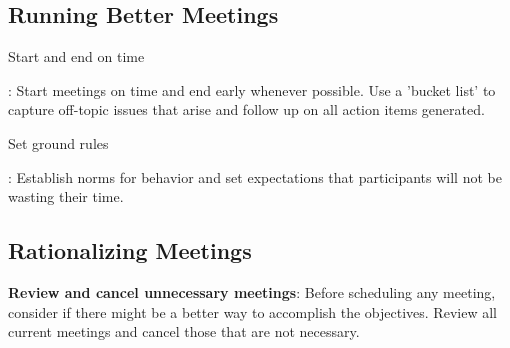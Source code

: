 \subsection{Running Better Meetings}
\begin{enumerate}
{\bfseries \item Start and end on time}: Start meetings on time and end early whenever possible. Use a 'bucket list' to capture off-topic issues that arise and follow up on all action items generated.
{\bfseries \item Set ground rules}: Establish norms for behavior and set expectations that participants will not be wasting their time.
\end{enumerate}
\subsection{Rationalizing Meetings}
{\bfseries Review and cancel unnecessary meetings}: Before scheduling any meeting, consider if there might be a better way to accomplish the objectives. Review all current meetings and cancel those that are not necessary.
